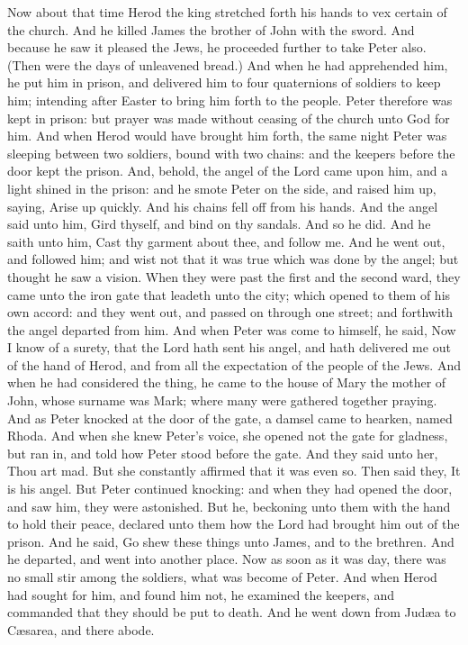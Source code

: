  Now about that time Herod the king stretched forth his
hands to vex certain of the church.  And he killed James the
brother of John with the sword.  And because he saw it
pleased the Jews, he proceeded further to take Peter also. (Then were
the days of unleavened bread.)  And when he had apprehended
him, he put him in prison, and delivered him to four quaternions of
soldiers to keep him; intending after Easter to bring him forth to the
people.  Peter therefore was kept in prison: but prayer was
made without ceasing of the church unto God for him.  And
when Herod would have brought him forth, the same night Peter was
sleeping between two soldiers, bound with two chains: and the keepers
before the door kept the prison.  And, behold, the angel of
the Lord came upon him, and a light shined in the prison: and he smote
Peter on the side, and raised him up, saying, Arise up quickly. And his
chains fell off from his hands.  And the angel said unto
him, Gird thyself, and bind on thy sandals. And so he did. And he saith
unto him, Cast thy garment about thee, and follow me.  And
he went out, and followed him; and wist not that it was true which was
done by the angel; but thought he saw a vision.  When they
were past the first and the second ward, they came unto the iron gate
that leadeth unto the city; which opened to them of his own accord: and
they went out, and passed on through one street; and forthwith the angel
departed from him.  And when Peter was come to himself, he
said, Now I know of a surety, that the Lord hath sent his angel, and
hath delivered me out of the hand of Herod, and from all the expectation
of the people of the Jews.  And when he had considered the
thing, he came to the house of Mary the mother of John, whose surname
was Mark; where many were gathered together praying.  And
as Peter knocked at the door of the gate, a damsel came to hearken,
named Rhoda.  And when she knew Peter's voice, she opened
not the gate for gladness, but ran in, and told how Peter stood before
the gate.  And they said unto her, Thou art mad. But she
constantly affirmed that it was even so. Then said they, It is his
angel.  But Peter continued knocking: and when they had
opened the door, and saw him, they were astonished.  But
he, beckoning unto them with the hand to hold their peace, declared unto
them how the Lord had brought him out of the prison. And he said, Go
shew these things unto James, and to the brethren. And he departed, and
went into another place.  Now as soon as it was day, there
was no small stir among the soldiers, what was become of Peter.
 And when Herod had sought for him, and found him not, he
examined the keepers, and commanded that they should be put to death.
And he went down from Judæa to Cæsarea, and there abode.

